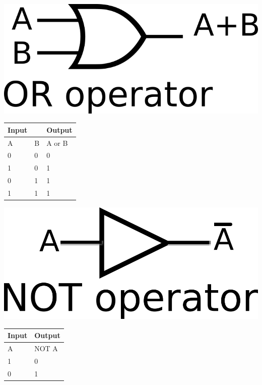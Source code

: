 \vspace{20mm}
\hspace{1in}
\begin{minipage}{.5\linewidth}
    \includegraphics[width=3 in]{images/or1.png}
	\label{img2}
\end{minipage}
\begin{minipage}{\linewidth}
\begin{tabular}{|ll|l|}
	\hline
	Input                   &   & Output  \\ \hline
    \multicolumn{1}{|l|}{A} & B & A or B \\ \hline
	\multicolumn{1}{|l|}{0} & 0 & 0       \\ \hline
	\multicolumn{1}{|l|}{1} & 0 & 1       \\ \hline
	\multicolumn{1}{|l|}{0} & 1 & 1       \\ \hline
	\multicolumn{1}{|l|}{1} & 1 & 1       \\ \hline
\end{tabular}
\end{minipage}


\vspace{20mm}
\hspace{1in}
\begin{minipage}{.5\linewidth}
    \includegraphics[width=3 in]{images/not1.png}
	\label{img2}
\end{minipage}
\begin{minipage}{\linewidth}
	\begin{tabular}{|l|l|}
		\hline
		Input & Output \\ \hline
		A     & NOT A  \\ \hline
		1 & 0     \\ \hline
		0 & 1     \\ \hline
	\end{tabular}
\end{minipage}


